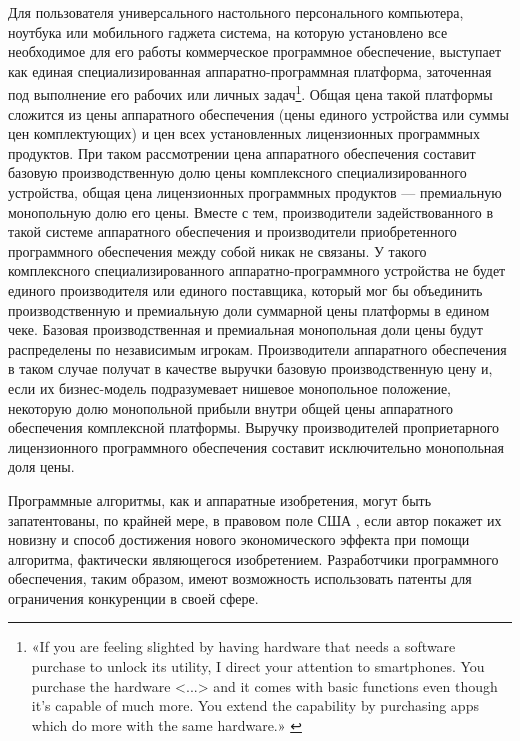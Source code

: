 \documentclass{article}
\begin{document}
Для пользователя универсального настольного персонального компьютера, ноутбука или мобильного гаджета система, на которую установлено все необходимое для его работы коммерческое программное обеспечение, выступает как единая специализированная аппаратно-программная платформа, заточенная под выполнение его рабочих или личных задач\footnote{«If you are feeling slighted by having hardware that needs a software purchase to unlock its utility, I direct your attention to smartphones. You purchase the hardware <...> and it comes with basic functions even though it’s capable of much more. You extend the capability by purchasing apps which do more with the same hardware.» \cite{hackdayUnlockableFeatures2017}}. Общая цена такой платформы сложится из цены аппаратного обеспечения (цены единого устройства или суммы цен комплектующих) и цен всех установленных лицензионных программных продуктов. При таком рассмотрении цена аппаратного обеспечения составит базовую производственную долю цены комплексного специализированного устройства, общая цена лицензионных программных продуктов — премиальную монопольную долю его цены. Вместе с тем, производители задействованного в такой системе аппаратного обеспечения и производители приобретенного программного обеспечения между собой никак не связаны. У такого комплексного специализированного аппаратно-программного устройства не будет единого производителя или единого поставщика, который мог бы объединить производственную и премиальную доли суммарной цены платформы в едином чеке. Базовая производственная и премиальная монопольная доли цены будут распределены по независимым игрокам. Производители аппаратного обеспечения в таком случае получат в качестве выручки базовую производственную цену и, если их бизнес-модель подразумевает нишевое монопольное положение, некоторую долю монопольной прибыли внутри общей цены аппаратного обеспечения комплексной платформы. Выручку производителей проприетарного лицензионного программного обеспечения составит исключительно монопольная доля цены.

Программные алгоритмы, как и аппаратные изобретения, могут быть запатентованы, по крайней мере, в правовом поле США \cite{softwarePatentVsCopyright2024}, если автор покажет их новизну и способ достижения нового экономического эффекта при помощи алгоритма, фактически являющегося изобретением. Разработчики программного обеспечения, таким образом, имеют возможность использовать патенты для ограничения конкуренции в своей сфере.
\end{document}
